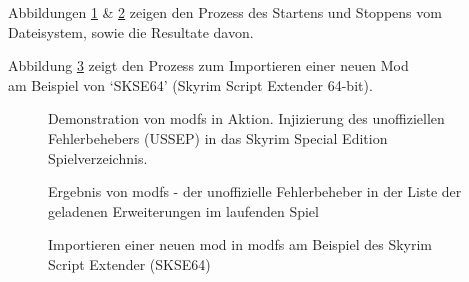 \documentclass[a4paper,numbers=withenddot,11pt]{scrartcl}
\begin{document}
Abbildungen \ref{fig:demo1} \& \ref{fig:demo2} zeigen den
Prozess des Startens und Stoppens vom Dateisystem, sowie die Resultate davon.

Abbildung \ref{fig:demo_importmod} zeigt den Prozess zum Importieren
einer neuen Mod\\am Beispiel von `SKSE64' (Skyrim Script Extender 64-bit).

\begin{figure}
  \setlength{\fboxsep}{0pt}
  \setlength{\fboxrule}{.5pt}
  \caption{Demonstration von modfs in Aktion.
  Injizierung des unoffiziellen Fehlerbehebers (USSEP) in das Skyrim Special Edition Spielverzeichnis.}
  \label{fig:demo1}
\end{figure}

\begin{figure}
  \setlength{\fboxsep}{0pt}
  \setlength{\fboxrule}{.5pt}
  \caption{Ergebnis von modfs - der unoffizielle Fehlerbeheber in der Liste der geladenen Erweiterungen im laufenden Spiel}
  \label{fig:demo2}
\end{figure}

\begin{figure}
  \setlength{\fboxsep}{0pt}
  \setlength{\fboxrule}{.5pt}
  \caption{Importieren einer neuen mod in modfs am Beispiel des Skyrim Script Extender (SKSE64)}
  \label{fig:demo_importmod}
\end{figure}
\end{document}
